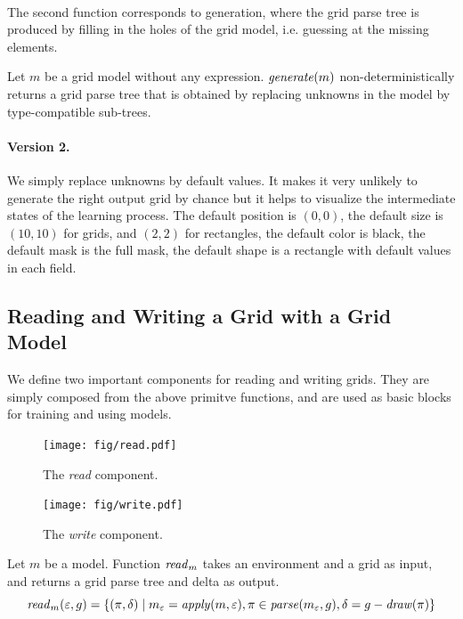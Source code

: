\documentclass[a4paper]{llncs}
\begin{document}
\paragraph{}
The second function corresponds to generation, where the grid parse
tree is produced by filling in the holes of the grid model,
i.e. guessing at the missing elements.

\begin{definition}
  Let $m$ be a grid model without any expression. ${\it generate}(m)$
  non-deterministically returns a grid parse tree that is obtained by
  replacing unknowns in the model by type-compatible sub-trees.
\end{definition}

\paragraph{Version 2.} We simply replace unknowns by default
values. It makes it very unlikely to generate the right output grid by
chance but it helps to visualize the intermediate states of the
learning process. The default position is $(0,0)$, the default size is
$(10,10)$ for grids, and $(2,2)$ for rectangles, the default color is
black, the default mask is the full mask, the default shape is a
rectangle with default values in each field.


\subsection{Reading and Writing a Grid with a Grid Model}
\label{read:write}

We define two important components for reading and writing grids.
They are simply composed from the above primitve functions, and are
used as basic blocks for training and using models.

\begin{figure}[t]
  \centering
  \begin{minipage}[b]{0.55\textwidth}
    \centering
    \texttt{[image: fig/read.pdf]}
    \caption{The {\em read} component.}
    \label{fig:read}
  \end{minipage}
  \hfill
  \begin{minipage}[b]{0.44\textwidth}
    \centering
    \texttt{[image: fig/write.pdf]}
    \caption{The {\em write} component.}
    \label{fig:write}
  \end{minipage}
\end{figure}

\begin{definition}
  Let $m$ be a model. Function ${\it read}_m$ takes an environment and
  a grid as input, and returns a grid parse tree and delta as output.
  \[ {\it read}_m(\varepsilon,g) = \{ (\pi,\delta) \mid m_\varepsilon
    = {\it apply}(m,\varepsilon), \pi \in {\it
      parse}(m_\varepsilon,g), \delta = g - {\it draw}(\pi) \} \]
\end{definition}
\end{document}
